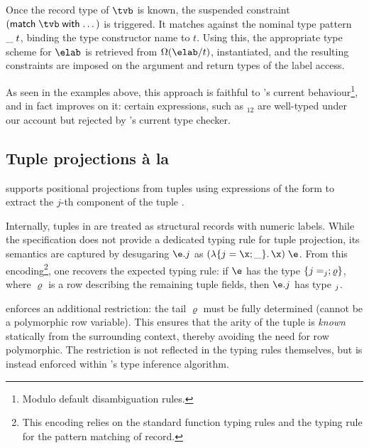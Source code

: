 \documentclass[acmsmall,screen,nonacm]{acmart}
\begin{document}
Once the record type of $\tvb$ is known, the suspended constraint $(\cmatchdots
\tvb)$ is triggered. It matches against the nominal type pattern ${\_} \mathrel{t}\mathclose{}$,
binding the type constructor name to $t$. Using this, the appropriate type
scheme for $\elab$ is retrieved from $\labenv(\elab/t)$, instantiated, and the
resulting constraints are imposed on the argument and return types of the label
access.



As seen in the examples above, this approach is faithful to \OCaml's current
behaviour\footnote {Modulo default disambiguation rules.}, and in fact
improves on it: certain expressions, such as $_{12}$ are well-typed
under our account but rejected by \OCaml's current type checker.

\subsection{Tuple projections \`a la \SML}

\SML supports positional projections from tuples using expressions of the form
 to extract the $j$-th component of the tuple .


Internally, tuples in \SML are treated as structural records with numeric
labels. While the specification \cite{TODO} does not provide a dedicated typing
rule for tuple projection, its semantics are captured by desugaring $\eproj \e
j$ as $\eapp {\parens {\efun {\erecord {j = \x; \wild}} \x}} \e$. From this
encoding\footnote{This encoding relies on the standard function typing rules
and the \SML typing rule for the pattern matching of record.}, one recovers the
expected typing rule: if $\e$ has the type $\{j = \relax_j; \varrho\}$,
where $\varrho$ is a row describing the remaining tuple fields, then $\eproj \e
j$ has type $\relax_j$.

\SML enforces an additional restriction: the tail $\varrho$ must be fully
determined (\ie cannot be a polymorphic row variable).  This ensures that the
arity of the tuple is \emph{known} statically from the surrounding context,
thereby avoiding the need for row polymorphic. The restriction is not reflected
in the typing rules themselves, but is instead enforced within \SML's type
inference algorithm.
\end{document}
